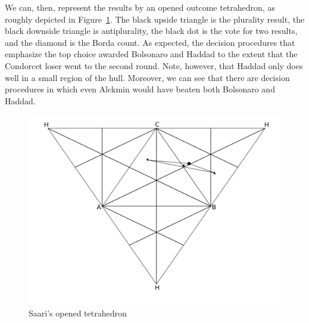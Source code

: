\documentclass[hidelinks,11pt]{article}
\begin{document}


We can, then, represent the results by an opened outcome tetrahedron, as roughly
depicted in Figure~\ref{fig:ot}. The black upside triangle is the plurality
result, the black downside triangle is antiplurality, the black dot is the vote
for two results, and the diamond is the Borda count. As expected, the decision
procedures that emphasize the top choice awarded Bolsonaro and Haddad to the
extent that the Condorcet loser went to the second round. Note, however, that
Haddad only does well in a small region of the hull. Moreover, we can see that
there are decision procedures in which even Alckmin would have beaten both
Bolsonaro and Haddad.

\begin{figure}[!h] \centering \includegraphics[width=0.8\columnwidth,
height=0.3\textheight]{./images/opened_tetrahedron1.png}
 \caption{Saari's opened tetrahedron }
 \label{fig:ot}
\end{figure}
\end{document}
